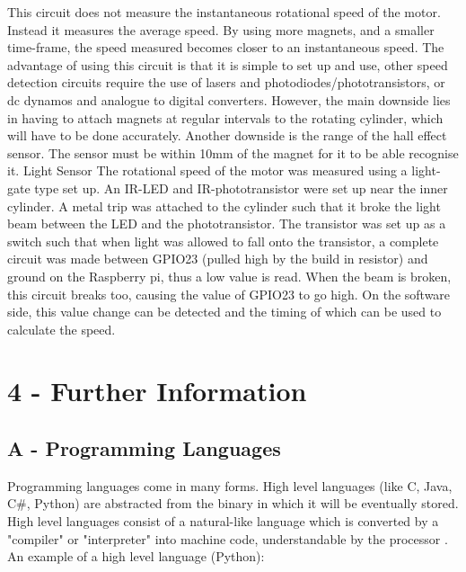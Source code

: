 \documentclass[twoside,a4]{report}
\def\br{\newline \newline \noindent}
\begin{document}
This circuit does not measure the instantaneous rotational speed of the motor. Instead it measures the average speed. By using more magnets, and a smaller time-frame, the speed measured becomes closer to an instantaneous speed. The advantage of using this circuit is that it is simple to set up and use, other speed detection circuits require the use of lasers and photodiodes/phototransistors, or dc dynamos and analogue to digital converters. However, the main downside lies in having to attach magnets at regular intervals to the rotating cylinder, which will have to be done accurately. Another downside is the range of the hall effect sensor. The sensor must be within 10mm of the magnet for it to be able recognise it. \newline \newline \noindent
\large Light Sensor \normalsize \br
The rotational speed of the motor was measured using a light-gate type set up. An IR-LED and IR-phototransistor were set up near the inner cylinder. A metal trip was attached to the cylinder such that it broke the light beam between the LED and the phototransistor. The transistor was set up as a switch such that when light was allowed to fall onto the transistor, a complete circuit was made between GPIO23 (pulled high by the build in resistor) and ground on the Raspberry pi, thus a low value is read. When the beam is broken, this circuit breaks too, causing the value of GPIO23 to go high. On the software side, this value change can be detected and the timing of which can be used to calculate the speed. \newline
\section{4 - Further Information}
\subsection*{A -  Programming Languages}
Programming languages come in many forms. High level languages (like C, Java, C\#, Python) are abstracted from the binary in which it will be eventually stored. High level languages consist of a natural-like language which is converted by a "compiler" or "interpreter" into machine code, understandable by the processor \cite{proglanghighlow}. \br
\noindent
An example of a high level language (Python):
\end{document}
